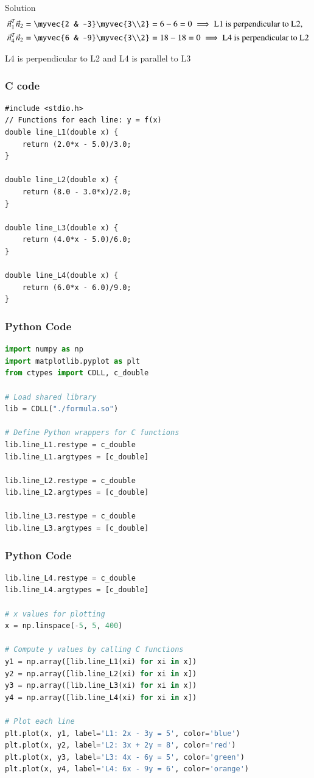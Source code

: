 \documentclass{beamer}
\begin{document}
\begin{frame}{Solution}
\begin{align}
\vec{n}_1^T \vec{n}_2 &= \myvec{2 & -3} \myvec{3\\2} = 6 - 6 = 0 
\implies \text{L1 is perpendicular to L2},\\
\vec{n}_4^T \vec{n}_2 &= \myvec{6 & -9} \myvec{3\\2} = 18 - 18 = 0 
\implies \text{L4 is perpendicular to L2}
\end{align}

L4 is perpendicular to L2 and L4 is parallel to L3
\end{frame}

\begin{frame}[fragile]
    \frametitle{C code}
    \begin{lstlisting}
#include <stdio.h>
// Functions for each line: y = f(x)
double line_L1(double x) {
    return (2.0*x - 5.0)/3.0;
}

double line_L2(double x) {
    return (8.0 - 3.0*x)/2.0;
}

double line_L3(double x) {
    return (4.0*x - 5.0)/6.0;
}

double line_L4(double x) {
    return (6.0*x - 6.0)/9.0;
}
    \end{lstlisting}
\end{frame}

\begin{frame}[fragile]
    \frametitle{Python Code}
    \begin{lstlisting}[language=Python]
import numpy as np
import matplotlib.pyplot as plt
from ctypes import CDLL, c_double

# Load shared library
lib = CDLL("./formula.so")

# Define Python wrappers for C functions
lib.line_L1.restype = c_double
lib.line_L1.argtypes = [c_double]

lib.line_L2.restype = c_double
lib.line_L2.argtypes = [c_double]

lib.line_L3.restype = c_double
lib.line_L3.argtypes = [c_double]
    \end{lstlisting}
\end{frame}
\begin{frame}[fragile]
    \frametitle{Python Code}
    \begin{lstlisting}[language=Python]
lib.line_L4.restype = c_double
lib.line_L4.argtypes = [c_double]

# x values for plotting
x = np.linspace(-5, 5, 400)

# Compute y values by calling C functions
y1 = np.array([lib.line_L1(xi) for xi in x])
y2 = np.array([lib.line_L2(xi) for xi in x])
y3 = np.array([lib.line_L3(xi) for xi in x])
y4 = np.array([lib.line_L4(xi) for xi in x])

# Plot each line
plt.plot(x, y1, label='L1: 2x - 3y = 5', color='blue')
plt.plot(x, y2, label='L2: 3x + 2y = 8', color='red')
plt.plot(x, y3, label='L3: 4x - 6y = 5', color='green')
plt.plot(x, y4, label='L4: 6x - 9y = 6', color='orange')
    \end{lstlisting}
\end{frame}
\end{document}
